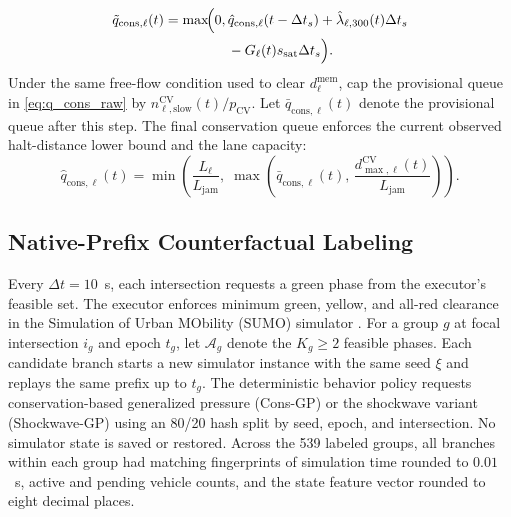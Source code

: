 \documentclass[letterpaper,journal]{IEEEtran}
\begin{document}
\begin{equation}
\begin{split}
  \tilde q_{\mathrm{cons},\ell}(t) = \max\!\Bigl(0,\,
     &\hat q_{\mathrm{cons},\ell}(t-\Delta t_s) + \hat\lambda_{\ell,300}(t)\Delta t_s\\
     &-G_\ell(t)s_{\mathrm{sat}}\Delta t_s\Bigr).
\end{split}
  \label{eq:q_cons_raw}
\end{equation}
Under the same free-flow condition used to clear $d_\ell^{\mathrm{mem}}$, cap the provisional queue in \eqref{eq:q_cons_raw} by $n_{\ell,\mathrm{slow}}^{\mathrm{CV}}(t)/p_{\mathrm{CV}}$. Let $\bar q_{\mathrm{cons},\ell}(t)$ denote the provisional queue after this step. The final conservation queue enforces the current observed halt-distance lower bound and the lane capacity:
\begin{equation}
  \hat q_{\mathrm{cons},\ell}(t) =
  \min\!\left(\frac{L_\ell}{L_{\mathrm{jam}}},\;
    \max\!\left(\bar q_{\mathrm{cons},\ell}(t),\,
       \frac{d_{\max,\ell}^{\mathrm{CV}}(t)}{L_{\mathrm{jam}}}\right)\right).
  \label{eq:q_cons}
\end{equation}

\subsection{Native-Prefix Counterfactual Labeling}
Every $\Delta t=10$~s, each intersection requests a green phase from the executor's feasible set. The executor enforces minimum green, yellow, and all-red clearance in the Simulation of Urban MObility (SUMO) simulator \cite{lopez2018microscopic}. For a group $g$ at focal intersection $i_g$ and epoch $t_g$, let $\mathcal{A}_g$ denote the $K_g\ge2$ feasible phases. Each candidate branch starts a new simulator instance with the same seed $\xi$ and replays the same prefix up to $t_g$. The deterministic behavior policy requests conservation-based generalized pressure (Cons-GP) or the shockwave variant (Shockwave-GP) using an 80/20 hash split by seed, epoch, and intersection. No simulator state is saved or restored. Across the 539 labeled groups, all branches within each group had matching fingerprints of simulation time rounded to $0.01$~s, active and pending vehicle counts, and the state feature vector rounded to eight decimal places.
\end{document}
